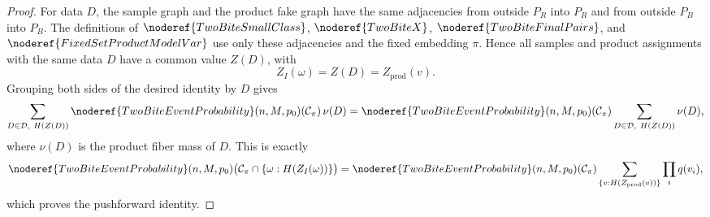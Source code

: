 \begin{proof}
For data \(D\), the sample graph and the product fake graph have the same
adjacencies from outside \(P_R\) into \(P_R\) and from outside \(P_B\) into
\(P_B\).  The definitions of \(\noderef{TwoBiteSmallClass}\),
\(\noderef{TwoBiteX}\), \(\noderef{TwoBiteFinalPairs}\), and
\(\noderef{FixedSetProductModelVar}\) use only these adjacencies and the fixed
embedding \(\pi\).  Hence all samples and product assignments with the same
data \(D\) have a common value \(Z(D)\), with
\[
Z_I(\omega)=Z(D)=Z_{\mathrm{prod}}(v).
\]
Grouping both sides of the desired identity by \(D\) gives
\[
\sum_{D\in\mathcal D,\ H(Z(D))}
\noderef{TwoBiteEventProbability}(n,M,p_0)(\mathcal C_\pi)\,\nu(D)
=
\noderef{TwoBiteEventProbability}(n,M,p_0)(\mathcal C_\pi)
\sum_{D\in\mathcal D,\ H(Z(D))}\nu(D),
\]
where \(\nu(D)\) is the product fiber mass of \(D\).  This is exactly
\[
\noderef{TwoBiteEventProbability}(n,M,p_0)
 \bigl(\mathcal C_\pi\cap \{\omega:H(Z_I(\omega))\}\bigr)
=
\noderef{TwoBiteEventProbability}(n,M,p_0)(\mathcal C_\pi)
 \sum_{\{v:H(Z_{\mathrm{prod}}(v))\}}\prod_iq(v_i),
\]
which proves the pushforward identity.
\end{proof}
